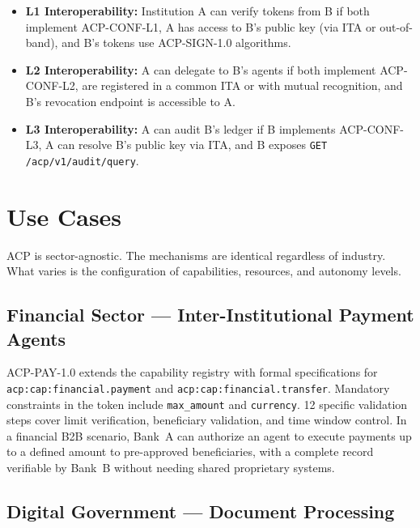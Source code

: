 \documentclass[11pt]{article}
\theoremstyle{definition}
\begin{document}
\begin{itemize}[noitemsep]
  \item \textbf{L1 Interoperability:} Institution A can verify tokens from B if both implement ACP-CONF-L1,
        A has access to B's public key (via ITA or out-of-band), and B's tokens use ACP-SIGN-1.0 algorithms.
  \item \textbf{L2 Interoperability:} A can delegate to B's agents if both implement ACP-CONF-L2,
        are registered in a common ITA or with mutual recognition, and B's revocation endpoint is accessible to A.
  \item \textbf{L3 Interoperability:} A can audit B's ledger if B implements ACP-CONF-L3,
        A can resolve B's public key via ITA, and B exposes \texttt{GET /acp/v1/audit/query}.
\end{itemize}

\section{Use Cases}

ACP is sector-agnostic. The mechanisms are identical regardless of industry.
What varies is the configuration of capabilities, resources, and autonomy levels.

\subsection{Financial Sector --- Inter-Institutional Payment Agents}

{\sloppy
ACP-PAY-1.0 extends the capability registry with formal specifications for
\texttt{acp:cap:financial.payment} and \texttt{acp:cap:financial.transfer}.
Mandatory constraints in the token include \texttt{max\_amount} and \texttt{currency}.
12 specific validation steps cover limit verification, beneficiary validation, and time window control.
In a financial B2B scenario, Bank~A can authorize an agent to execute payments up to a defined amount
to pre-approved beneficiaries, with a complete record verifiable by Bank~B
without needing shared proprietary systems.
\par}

\subsection{Digital Government --- Document Processing}
\end{document}
